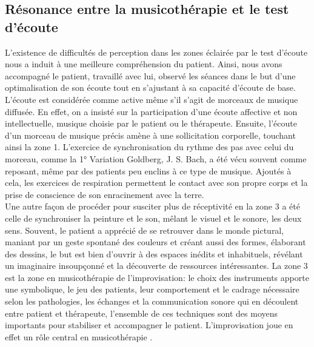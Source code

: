\subsection{Résonance entre %
	la musicothérapie et le test d'écoute}
L'existence de difficultés de perception dans les zones éclairée par le test d'écoute nous a
	induit à une meilleure compréhension du patient. %
	  Ainsi, nous avons accompagné le patient, travaillé avec lui, observé les séances dans le but d'une 
	  optimalisation de 
	son écoute %
	tout en s'ajustant  à sa 
	capacité 
	d'écoute de base.
		\\
L'écoute est considérée comme active même s'il s'agit de morceaux de musique diffusée. En effet,  on a 
insisté sur la participation d'une écoute affective et non intellectuelle, 
musique choisie par le patient ou le thérapeute.
Ensuite, l'écoute d'un morceau de musique précis amène à une sollicitation corporelle, touchant 
ainsi  la zone 1. 
L'exercice de synchronisation du rythme des pas avec celui du morceau, comme  la 1° 
Variation Goldberg, J. S. Bach,  a été vécu souvent comme reposant, même par des patients peu 
enclins à ce type 
de musique. Ajoutés à cela, les exercices de respiration 
permettent le contact avec 
son propre corps et la prise de conscience de son enracinement avec la terre.
\\	
Une autre façon de procéder pour susciter plus de réceptivité en la zone 3 a été celle de 
synchroniser la 
peinture et 
le son, mêlant le visuel et le sonore, les deux sens.  Souvent, le patient a apprécié de se 
retrouver dans le monde 
pictural, maniant  par un geste spontané des couleurs et créant aussi des formes, élaborant des dessins,
le but est bien d'ouvrir à des espaces inédits et  inhabituels, révélant un imaginaire insoupçonné et 
la découverte de ressources intéressantes.
La zone 3 est la zone en musicothérapie de l'improvisation: le choix des instruments apporte une 
symbolique, 
le jeu des patients, leur comportement et  le cadrage nécessaire selon les pathologies, les 
échanges et la communication sonore qui en découlent entre patient et thérapeute, l'ensemble de ces 
techniques sont des moyens importants pour stabiliser et accompagner le patient. L'improvisation joue 
en effet un 
rôle central en musicothérapie \autocite {hegi_improvisation_1993}.
  
